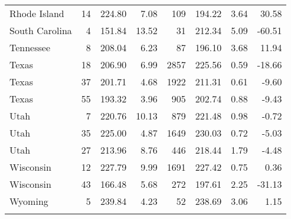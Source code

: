 \begin{longtable}{lrrr@{\extracolsep{10pt}}rrrr}
  Rhode Island &  14 & 224.80 & 7.08 & 109 & 194.22 & 3.64 & 30.58 \\ 
  South Carolina &   4 & 151.84 & 13.52 &  31 & 212.34 & 5.09 & -60.51 \\ 
  Tennessee &   8 & 208.04 & 6.23 &  87 & 196.10 & 3.68 & 11.94 \\ 
  Texas &  18 & 206.90 & 6.99 & 2857 & 225.56 & 0.59 & -18.66 \\ 
  Texas &  37 & 201.71 & 4.68 & 1922 & 211.31 & 0.61 & -9.60 \\ 
  Texas &  55 & 193.32 & 3.96 & 905 & 202.74 & 0.88 & -9.43 \\ 
  Utah &   7 & 220.76 & 10.13 & 879 & 221.48 & 0.98 & -0.72 \\ 
  Utah &  35 & 225.00 & 4.87 & 1649 & 230.03 & 0.72 & -5.03 \\ 
  Utah &  27 & 213.96 & 8.76 & 446 & 218.44 & 1.79 & -4.48 \\ 
  Wisconsin &  12 & 227.79 & 9.99 & 1691 & 227.42 & 0.75 & 0.36 \\ 
  Wisconsin &  43 & 166.48 & 5.68 & 272 & 197.61 & 2.25 & -31.13 \\ 
  Wyoming &   5 & 239.84 & 4.23 &  52 & 238.69 & 3.06 & 1.15 \\ 
   \hline
\hline
\label{g4readinglrlevel1}
\end{longtable}
